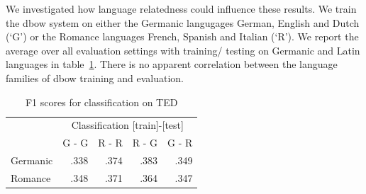 We investigated how language relatedness could influence these results. We train the dbow system on either the Germanic langugages German, English and Dutch (`G') or the Romance languages French, Spanish and Italian (`R'). 
We report the average over all evaluation settings with training/ testing on Germanic and Latin languages in table~\ref{t:dbow_families}. There is no apparent correlation between the language families of dbow training and evaluation.
\begin{table}[ht]
\center
\setlength\tabcolsep{2pt}
\begin{tabular}{l | r r r r}
		& \multicolumn{4}{c}{Classification [train]-[test]}	\\
		&G - G	&R - R	&R - G	&G - R	\\\hline
Germanic		&.338		&.374		&.383		&.349		\\
Romance		&.348		&.371		&.364		&.347		\\
\end{tabular}
\caption{F1 scores for classification on TED}
\label{t:dbow_families}
\end{table}






